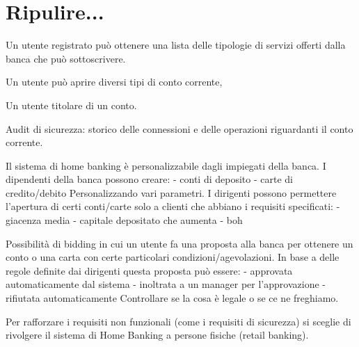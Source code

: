\documentclass[10pt]{softeng} %
\begin{document}
\flushbottom %

\maketitle %

\tableofcontents %

\thispagestyle{empty} %



\section{Ripulire...}


Un utente registrato pu\`o ottenere una lista delle tipologie di servizi offerti dalla banca che pu\`o sottoscrivere.

Un utente pu\`o aprire diversi tipi di conto corrente, 

Un utente titolare di un conto.

Audit di sicurezza:
storico delle connessioni e delle operazioni riguardanti il conto corrente.

Il sistema di home banking \`e personalizzabile dagli impiegati della banca.
I dipendenti della banca possono creare:
- conti di deposito
- carte di credito/debito
Personalizzando vari parametri.
I dirigenti possono permettere l'apertura di certi conti/carte solo a clienti che abbiano i requisiti specificati:
- giacenza media
- capitale depositato che aumenta
- boh

Possibilit\`a di bidding in cui un utente fa una proposta alla banca per ottenere un conto o una carta con certe particolari condizioni/agevolazioni.
In base a delle regole definite dai dirigenti questa proposta pu\`o essere:
- approvata automaticamente dal sistema
- inoltrata a un manager per l'approvazione
- rifiutata automaticamente
Controllare se la cosa \`e legale o se ce ne freghiamo.




Per rafforzare i requisiti non funzionali (come i requisiti di sicurezza) si sceglie di rivolgere il sistema di Home Banking a persone fisiche (retail banking).
\end{document}
